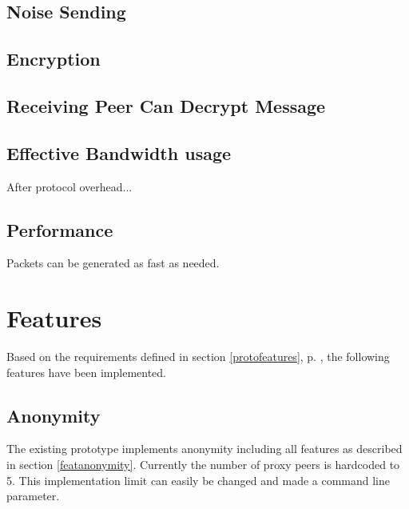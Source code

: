 \subsection{Noise Sending}
\subsection{Encryption}
\subsection{Receiving Peer Can Decrypt Message}
\subsection{Effective Bandwidth usage}
After protocol overhead...
\subsection{Performance}
Packets can be generated as fast as needed.

\section{Features}
Based on the requirements defined in section \ref{protofeatures}, 
p. \pageref{protofeatures}, the following features have been implemented. 
\subsection{Anonymity}
The existing prototype implements anonymity including
all features as described in section \ref{featanonymity}.
Currently the number of proxy peers is hardcoded to 5. This implementation
limit can easily be changed and made a command line parameter.
